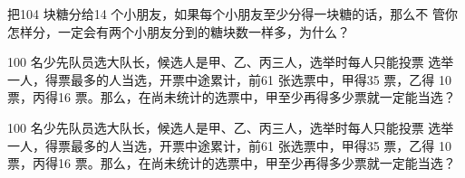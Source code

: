 \begin{example}
    把104 块糖分给14 个小朋友，如果每个小朋友至少分得一块糖的话，那么不
    管你怎样分，一定会有两个小朋友分到的糖块数一样多，为什么？
\end{example}
\vspace{3cm}
\begin{example}
    100 名少先队员选大队长，候选人是甲、乙、丙三人，选举时每人只能投票
    选举一人，得票最多的人当选，开票中途累计，前61 张选票中，甲得35 票，乙得
    10 票，丙得16 票。那么，在尚未统计的选票中，甲至少再得多少票就一定能当选？
\end{example}
\vspace{3cm}
\begin{example}
    100 名少先队员选大队长，候选人是甲、乙、丙三人，选举时每人只能投票
    选举一人，得票最多的人当选，开票中途累计，前61 张选票中，甲得35 票，乙得
    10 票，丙得16 票。那么，在尚未统计的选票中，甲至少再得多少票就一定能当选？
\end{example}